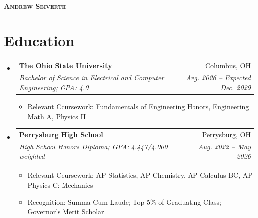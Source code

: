 \documentclass[letterpaper,11pt]{article}
\makeatletter
\newcommand{\resumeItem}[1]{
  \item\small{{#1 \vspace{-2pt}}}
}
\newcommand{\resumeSubheading}[4]{
  \vspace{-2pt}\item
    \begin{tabular*}{0.97\textwidth}[t]{l@{\extracolsep{\fill}}r}
      \textbf{#1} & #2 \\
      \textit{\small#3} & \textit{\small #4} \\
    \end{tabular*}\vspace{-7pt}
}
\newcommand{\resumeSubHeadingListStart}{\begin{itemize}[leftmargin=0.15in, label={}]}
\newcommand{\resumeSubHeadingListEnd}{\end{itemize}}
\newcommand{\resumeItemListStart}{\begin{itemize}}
\newcommand{\resumeItemListEnd}{\end{itemize}\vspace{-5pt}}
\makeatother
\begin{document}

\begin{center}
  \textbf{\Huge \scshape Andrew Seiverth} \\ \vspace{10pt}
  \small
  \iftoggle{publicversion}
    {
      (555) 123-4567 $|$
      \href{mailto:me@email.com}{\underline{me@email.com}} $|$
      \href{https://www.\linkedin}{\underline{\linkedin}} $|$
    }
    {
      {\phone} $|$
      \href{mailto:\email}{\underline{\email}} $|$
      \href{https://www.\linkedin}{\underline{\linkedin}}
    }
\end{center}

\section{Education}
\resumeSubHeadingListStart
  \resumeSubheading
    {The Ohio State University}{Columbus, OH}
    {Bachelor of Science in Electrical and Computer Engineering; GPA: 4.0}{Aug. 2026 -- Expected Dec. 2029}
  \resumeItemListStart
    \resumeItem{Relevant Coursework: Fundamentals of Engineering Honors, Engineering Math A, Physics II}
  \resumeItemListEnd
  \resumeSubheading
    {Perrysburg High School}{Perrysburg, OH}
    {High School Honors Diploma; GPA: 4.447/4.000 weighted}{Aug. 2022 -- May 2026}
  \resumeItemListStart
    \resumeItem{Relevant Coursework: AP Statistics, AP Chemistry, AP Calculus BC, AP Physics C: Mechanics}
    \resumeItem{Recognition: Summa Cum Laude; Top 5\% of Graduating Class; Governor's Merit Scholar}
  \resumeItemListEnd
\resumeSubHeadingListEnd
\end{document}
